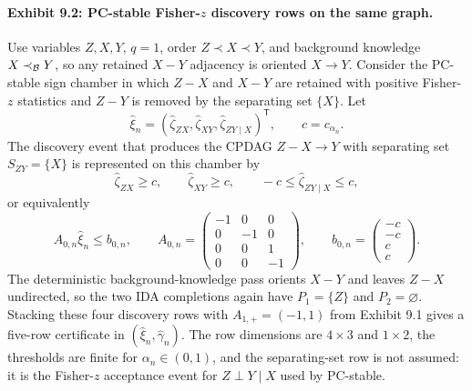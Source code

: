 \documentclass[11pt]{article}
\newcommand{\transpose}{\mathsf{T}}
\theoremstyle{definition}
\theoremstyle{plain}
\theoremstyle{remark}
\begin{document}
\paragraph{Exhibit 9.2: PC-stable Fisher-\(z\) discovery rows on the same graph.}
Use variables \(Z,X,Y\), \(q=1\), order \(Z\prec X\prec Y\), and background knowledge \(X\prec_{\cal B}Y\), so any retained \(X-Y\) adjacency is oriented \(X\to Y\). Consider the PC-stable sign chamber in which \(Z-X\) and \(X-Y\) are retained with positive Fisher-\(z\) statistics and \(Z-Y\) is removed by the separating set \(\{X\}\). Let
\[
\hat\xi_n=(\hat\zeta_{ZX},\hat\zeta_{XY},\hat\zeta_{ZY\mid X})^\transpose,\qquad c=c_{\alpha_n}.
\]
The discovery event that produces the CPDAG \(Z-X\to Y\) with separating set \(S_{ZY}=\{X\}\) is represented on this chamber by
\[
\hat\zeta_{ZX}\ge c,\qquad \hat\zeta_{XY}\ge c,\qquad
-c\le \hat\zeta_{ZY\mid X}\le c,
\]
or equivalently
\[
A_{0,n}\hat\xi_n\le b_{0,n},\qquad
A_{0,n}=
\begin{pmatrix}
-1&0&0\\
0&-1&0\\
0&0&1\\
0&0&-1
\end{pmatrix},\qquad
b_{0,n}=
\begin{pmatrix}
-c\\
-c\\
c\\
c
\end{pmatrix}.
\]
The deterministic background-knowledge pass orients \(X-Y\) and leaves \(Z-X\) undirected, so the two IDA completions again have \(P_1=\{Z\}\) and \(P_2=\varnothing\). Stacking these four discovery rows with \(A_{1,+}=(-1,1)\) from Exhibit 9.1 gives a five-row certificate in \((\hat\xi_n,\hat\gamma_n)\). The row dimensions are \(4\times3\) and \(1\times2\), the thresholds are finite for \(\alpha_n\in(0,1)\), and the separating-set row is not assumed: it is the Fisher-\(z\) acceptance event for \(Z\perp Y\mid X\) used by PC-stable.
\end{document}
